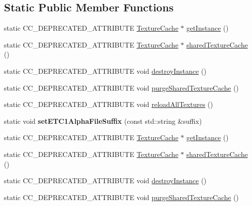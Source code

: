 \subsection*{Static Public Member Functions}
\begin{DoxyCompactItemize}
\item 
static C\+C\+\_\+\+D\+E\+P\+R\+E\+C\+A\+T\+E\+D\+\_\+\+A\+T\+T\+R\+I\+B\+U\+TE \hyperlink{classTextureCache}{Texture\+Cache} $\ast$ \hyperlink{classTextureCache_aedd5e47ab3b453d894eab82ae18d80af}{get\+Instance} ()
\item 
static C\+C\+\_\+\+D\+E\+P\+R\+E\+C\+A\+T\+E\+D\+\_\+\+A\+T\+T\+R\+I\+B\+U\+TE \hyperlink{classTextureCache}{Texture\+Cache} $\ast$ \hyperlink{classTextureCache_a77a4493baac10bdfc2c7c91361a9f622}{shared\+Texture\+Cache} ()
\item 
static C\+C\+\_\+\+D\+E\+P\+R\+E\+C\+A\+T\+E\+D\+\_\+\+A\+T\+T\+R\+I\+B\+U\+TE void \hyperlink{classTextureCache_a39aaf943d5c4969590a5f0c2f2008d68}{destroy\+Instance} ()
\item 
static C\+C\+\_\+\+D\+E\+P\+R\+E\+C\+A\+T\+E\+D\+\_\+\+A\+T\+T\+R\+I\+B\+U\+TE void \hyperlink{classTextureCache_a61daeb91b7d2cd8228fd4849384108c1}{purge\+Shared\+Texture\+Cache} ()
\item 
static C\+C\+\_\+\+D\+E\+P\+R\+E\+C\+A\+T\+E\+D\+\_\+\+A\+T\+T\+R\+I\+B\+U\+TE void \hyperlink{classTextureCache_ab02c8d452f1ac6f8213b5931fbc1e89f}{reload\+All\+Textures} ()
\item 
\mbox{\label{classTextureCache_a41c596c1cac94d1ab61f698a835a329f}} 
static void {\bfseries set\+E\+T\+C1\+Alpha\+File\+Suffix} (const std\+::string \&suffix)
\item 
static C\+C\+\_\+\+D\+E\+P\+R\+E\+C\+A\+T\+E\+D\+\_\+\+A\+T\+T\+R\+I\+B\+U\+TE \hyperlink{classTextureCache}{Texture\+Cache} $\ast$ \hyperlink{classTextureCache_aa3b70b207c1fe514b6806695dbc43564}{get\+Instance} ()
\item 
static C\+C\+\_\+\+D\+E\+P\+R\+E\+C\+A\+T\+E\+D\+\_\+\+A\+T\+T\+R\+I\+B\+U\+TE \hyperlink{classTextureCache}{Texture\+Cache} $\ast$ \hyperlink{classTextureCache_ae5d28e68b30d4d9491db6ab0766eb25c}{shared\+Texture\+Cache} ()
\item 
static C\+C\+\_\+\+D\+E\+P\+R\+E\+C\+A\+T\+E\+D\+\_\+\+A\+T\+T\+R\+I\+B\+U\+TE void \hyperlink{classTextureCache_aecf51262381fa7b3e85066bb1b0a3b06}{destroy\+Instance} ()
\item 
static C\+C\+\_\+\+D\+E\+P\+R\+E\+C\+A\+T\+E\+D\+\_\+\+A\+T\+T\+R\+I\+B\+U\+TE void \hyperlink{classTextureCache_ab45bcaee3f6fd43a4d1dc29ff9107b4e}{purge\+Shared\+Texture\+Cache} ()

\end{DoxyCompactItemize}
